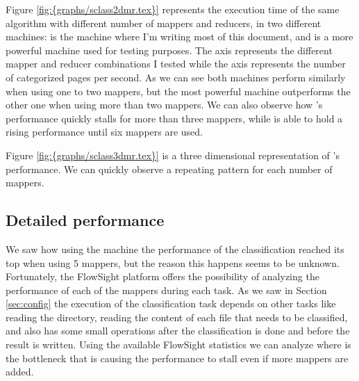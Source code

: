 Figure \ref{fig:{graphs/sclass2dmr.tex}} represents the execution time of the same algorithm with different number of mappers and reducers, in two different machines:  
is the machine where I'm writing most of this document, and  is a more powerful machine used for testing purposes. The  axis represents the 
different mapper and reducer combinations I tested while the  axis represents the number of categorized pages per second.
As we can see both machines perform similarly when using one to two mappers, but the most powerful machine outperforms the other one when using more than two mappers. We can also observe how 's performance
quickly stalls for more than three mappers, while  is able to hold a rising performance until six mappers are used.

Figure \ref{fig:{graphs/sclass3dmr.tex}} is a three dimensional representation of 's performance. We can quickly observe a repeating pattern for each number of mappers.

\subsection{Detailed performance}
We saw how using the  machine the performance of the classification reached its top when using 5 mappers, but the reason this happens seems to be unknown. 
Fortunately, the FlowSight platform offers the possibility of analyzing the performance of each of the mappers during each task. As we saw in Section \ref{sec:config} the execution of the classification
task depends on other tasks like reading the directory, reading the content of each file that needs to be classified, and also has some small operations after the classification is done and before
the result is written. Using the available FlowSight statistics we can analyze where is the bottleneck that is causing the performance to stall even if more mappers are added. 



